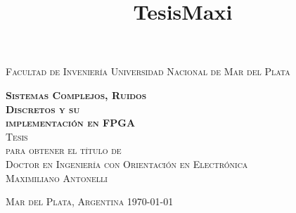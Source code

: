 

\title{TesisMaxi} %

\begin{titlepage}

\begin{center}
	
\textsc{\Large Facultad de Inveniería \- Universidad Nacional de Mar del Plata}\\[4em]

\vspace{4em}

\textsc{\Huge \textbf{Sistemas Complejos, Ruidos\\ Discretos y su\\[.7em] implementación en FPGA}}\\[4em]

\textsc{\large Tesis}\\[3em]

\textsc{para obtener el título de}\\[1em]

\textsc{Doctor en Ingeniería con Orientación en Electrónica}\\[1em]


\textsc{\Large Maximiliano Antonelli}\\[1em]


\vfill

\textsc{Mar del Plata, Argentina \hfill \today}

\end{center}

\end{titlepage}